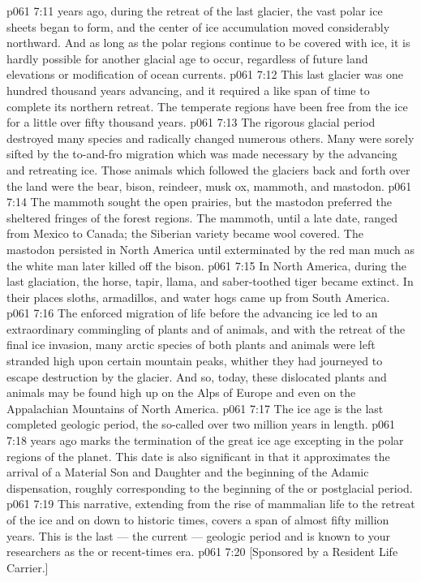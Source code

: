 \vs p061 7:11 \pc {} years ago, during the retreat of the last glacier, the vast polar ice sheets began to form, and the center of ice accumulation moved considerably northward. And as long as the polar regions continue to be covered with ice, it is hardly possible for another glacial age to occur, regardless of future land elevations or modification of ocean currents.
\vs p061 7:12 This last glacier was one hundred thousand years advancing, and it required a like span of time to complete its northern retreat. The temperate regions have been free from the ice for a little over fifty thousand years.
\vs p061 7:13 The rigorous glacial period destroyed many species and radically changed numerous others. Many were sorely sifted by the to\hyp{}and\hyp{}fro migration which was made necessary by the advancing and retreating ice. Those animals which followed the glaciers back and forth over the land were the bear, bison, reindeer, musk ox, mammoth, and mastodon.
\vs p061 7:14 The mammoth sought the open prairies, but the mastodon preferred the sheltered fringes of the forest regions. The mammoth, until a late date, ranged from Mexico to Canada; the Siberian variety became wool covered. The mastodon persisted in North America until exterminated by the red man much as the white man later killed off the bison.
\vs p061 7:15 In North America, during the last glaciation, the horse, tapir, llama, and saber\hyp{}toothed tiger became extinct. In their places sloths, armadillos, and water hogs came up from South America.
\vs p061 7:16 The enforced migration of life before the advancing ice led to an extraordinary commingling of plants and of animals, and with the retreat of the final ice invasion, many arctic species of both plants and animals were left stranded high upon certain mountain peaks, whither they had journeyed to escape destruction by the glacier. And so, today, these dislocated plants and animals may be found high up on the Alps of Europe and even on the Appalachian Mountains of North America.
\vs p061 7:17 \pc The ice age is the last completed geologic period, the so\hyp{}called  over two million years in length.
\vs p061 7:18 \pc {} years ago marks the termination of the great ice age excepting in the polar regions of the planet. This date is also significant in that it approximates the arrival of a Material Son and Daughter and the beginning of the Adamic dispensation, roughly corresponding to the beginning of the  or postglacial period.
\vs p061 7:19 \pc This narrative, extending from the rise of mammalian life to the retreat of the ice and on down to historic times, covers a span of almost fifty million years. This is the last --- the current --- geologic period and is known to your researchers as the  or recent\hyp{}times era.
\vsetoff
\vs p061 7:20 [Sponsored by a Resident Life Carrier.]
